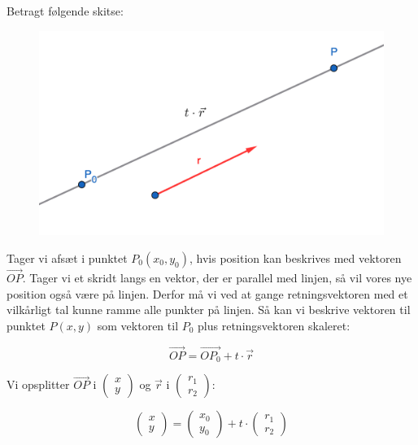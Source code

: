 \documentclass{article}
\makeatletter
\newenvironment{proofw}{\par
  \pushQED{\qed}%
  \normalfont \topsep6\p@\@plus6\p@\relax
  \trivlist
  \item[]\ignorespaces
}{%
  \popQED\endtrivlist\@endpefalse
}
\makeatother
\begin{document}
\begin{proofw}
    Betragt følgende skitse:
    \begin{figure}[h]
        \centering
        \includegraphics[scale=0.4]{skitser/linje_parameter.png}
    \end{figure}

Tager vi afsæt i punktet $P_0(x_0,y_0)$, hvis position kan beskrives
med vektoren $\vec{OP}$. Tager vi et skridt langs en vektor, der er parallel med linjen,
så vil vores nye position også være på linjen.
Derfor må vi ved at gange retningsvektoren med et vilkårligt tal
kunne ramme alle punkter på linjen.
Så kan vi beskrive vektoren til punktet $P(x,y)$
som vektoren til $P_0$ plus retningsvektoren skaleret:

$$
\vec{OP}=\vec{OP_0}+t\cdot \vec{r}
$$

Vi opsplitter $\vec{OP}$ i $\begin{pmatrix}
    x \\ y
\end{pmatrix}$ og $\vec{r}$ i $\begin{pmatrix}
    r_1 \\ r_2
\end{pmatrix}$:

$$
\begin{pmatrix}
    x
    \\
    y
\end{pmatrix}
=\begin{pmatrix}
    x_0
    \\
    y_0
\end{pmatrix}
+
t \cdot \begin{pmatrix}
    r_1
    \\
    r_2
\end{pmatrix}
$$
\end{proofw}
\end{document}
